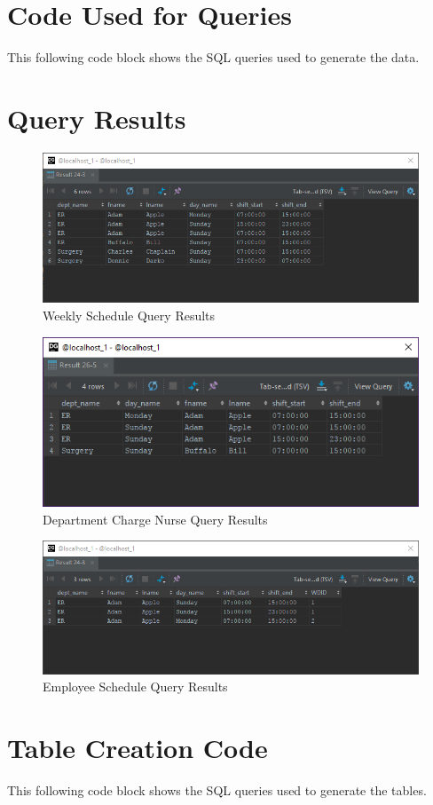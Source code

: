 \documentclass[letter,12pt]{texMemo}
\begin{document}
\maketitle

\section*{Code Used for Queries}
This following code block shows the SQL queries used to generate the data.


\section*{Query Results}
\begin{figure}[H]
	\centering
	\includegraphics[width=\textwidth]{query1.png}
	\caption{Weekly Schedule Query Results}
\end{figure}
\begin{figure}[H]
	\centering
	\includegraphics[width=\textwidth]{query2.png}
	\caption{Department Charge Nurse Query Results}
\end{figure}
\begin{figure}[H]
	\centering
	\includegraphics[width=\textwidth]{query3.png}
	\caption{Employee Schedule Query Results}
\end{figure}

\section*{Table Creation Code}
This following code block shows the SQL queries used to generate the tables. 



%
%
\end{document}
